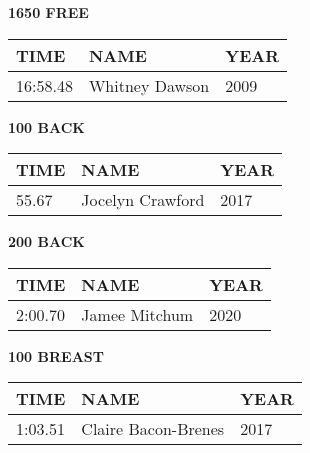 \begin{table}[H]
\centering
\begin{minipage}[t]{0.48\textwidth}
\centering
\textbf{1650 FREE}\\[0.1cm]
\begin{tabular}{@{}p{1.8cm}p{2.8cm}p{1.2cm}@{}}
\hline
    \textbf{TIME} & \textbf{NAME} & \textbf{YEAR} \\
\hline
    16:58.48 & Whitney Dawson & 2009 \\
\hline
\end{tabular}
\end{minipage}\hfill
\begin{minipage}[t]{0.48\textwidth}
\centering
\textbf{100 BACK}\\[0.1cm]
\begin{tabular}{@{}p{1.8cm}p{2.8cm}p{1.2cm}@{}}
\hline
    \textbf{TIME} & \textbf{NAME} & \textbf{YEAR} \\
\hline
    55.67 & Jocelyn Crawford & 2017 \\
\hline
\end{tabular}
\end{minipage}
\end{table}

\begin{table}[H]
\centering
\begin{minipage}[t]{0.48\textwidth}
\centering
\textbf{200 BACK}\\[0.1cm]
\begin{tabular}{@{}p{1.8cm}p{2.8cm}p{1.2cm}@{}}
\hline
    \textbf{TIME} & \textbf{NAME} & \textbf{YEAR} \\
\hline
    2:00.70 & Jamee Mitchum & 2020 \\
\hline
\end{tabular}
\end{minipage}\hfill
\begin{minipage}[t]{0.48\textwidth}
\centering
\textbf{100 BREAST}\\[0.1cm]
\begin{tabular}{@{}p{1.8cm}p{2.8cm}p{1.2cm}@{}}
\hline
    \textbf{TIME} & \textbf{NAME} & \textbf{YEAR} \\
\hline
    1:03.51 & Claire Bacon-Brenes & 2017 \\
\hline
\end{tabular}
\end{minipage}
\end{table}


